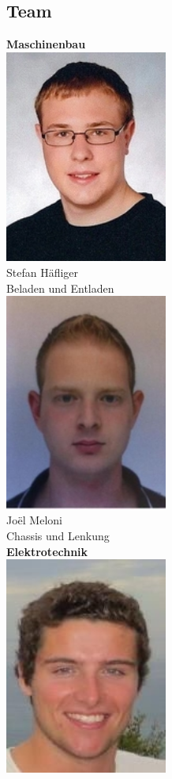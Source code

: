 \subsection{Team}
\begin{minipage}{0.45\textwidth}
\begin{flushleft} \large
\textbf{Maschinenbau}\\[2ex]
\includegraphics[width=0.4\textwidth]{./04_Projektmanagement/fig/stefanhaefliger.jpg}\\
Stefan Häfliger\\
Beladen und Entladen\\[2ex]
\includegraphics[width=0.4\textwidth]{./04_Projektmanagement/fig/joelmeloni.jpg}\\
Joël Meloni\\
Chassis und Lenkung\\[2ex]
\textbf{Elektrotechnik}\\[2ex]
\includegraphics[width=0.4\textwidth]{./04_Projektmanagement/fig/silvanritz.jpg}\\

\end{flushleft}
\end{minipage}
